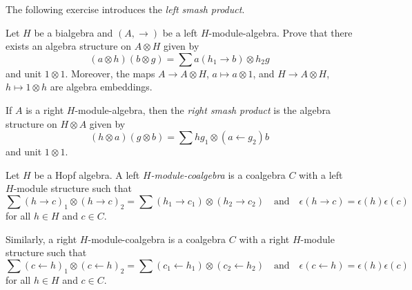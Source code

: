 
The following exercise introduces the 
\emph{left smash product}. 

\begin{exercise}
\label{xca:left_smash}
Let $H$ be a bialgebra and $(A,\rightarrow)$ be a left $H$-module-algebra.
Prove that there exists an algebra structure on $A\otimes H$ given by
\[
(a\otimes h)(b\otimes g)=\sum a(h_{1}\rightarrow b)\otimes h_{2}g
\]
and unit $1\otimes1$. Moreover, 
the maps $A\to A\otimes H$, $a\mapsto a\otimes1$,
and $H\to A\otimes H$, $h\mapsto 1\otimes h$ 
are algebra embeddings.
\end{exercise}

If $A$ is a right $H$-module-algebra, then 
the \emph{right smash product} is the algebra structure 
on $H\otimes A$ given by 
\[
(h\otimes a)(g\otimes b)=\sum hg_{1}\otimes(a\leftarrow g_{2})b
\]
and unit $1\otimes1$.



\begin{definition}
\label{def:module_coalgebra}
Let $H$ be a Hopf algebra. A left \emph{$H$-module-coalgebra}
is a coalgebra $C$ with a left $H$-module structure such that 
\[
\sum (h\rightarrow c)_{1}\otimes(h\rightarrow c)_{2} =\sum (h_{1}\rightarrow c_{1})\otimes (h_{2}\rightarrow c_{2})
\quad\text{and}\quad 
\epsilon(h\rightarrow c)  =\epsilon(h)\epsilon(c)
\]
for all $h\in H$ and $c\in C$. 
\end{definition}

Similarly, a right $H$-module-coalgebra 
is a coalgebra $C$ with a right
$H$-module structure such that 
\[
\sum (c\leftarrow h)_{1}\otimes(c\leftarrow h)_{2} =\sum (c_{1}\leftarrow h_{1})\otimes (c_{2}\leftarrow h_{2})
\quad\text{and}\quad 
\epsilon(c\leftarrow h)  =\epsilon(h)\epsilon(c)
\]
for all $h\in H$ and $c\in C$.

